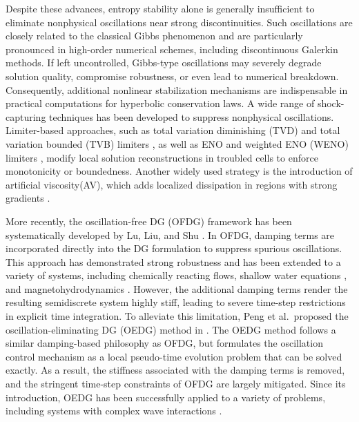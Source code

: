 \documentclass[fleqn,11pt]{amsart}
\begin{document}
Despite these advances, entropy stability alone is generally insufficient to eliminate nonphysical oscillations near strong discontinuities. Such oscillations are closely related to the classical Gibbs phenomenon \cite{gottlieb1997gibbs} and are particularly pronounced in high-order numerical schemes, including discontinuous Galerkin methods. If left uncontrolled, Gibbs-type oscillations may severely degrade solution
quality, compromise robustness, or even lead to numerical breakdown. Consequently, additional nonlinear stabilization mechanisms are indispensable
in practical computations for hyperbolic conservation laws.
A wide range of shock-capturing techniques has been developed to suppress nonphysical oscillations.
Limiter-based approaches, such as total variation diminishing (TVD) and total variation bounded (TVB) limiters \cite{cockburn1989tvb,burbeau2001problem}, as
well as ENO and weighted ENO (WENO) limiters
\cite{qiu2005runge,zhong2013simple,zhu2008runge}, modify local solution reconstructions in troubled cells to enforce monotonicity or boundedness. Another widely used strategy is the introduction of artificial viscosity(AV),
which adds localized dissipation in regions with strong gradients \cite{jameson1981numerical,jameson1993artificial,persson2006sub,barter2010shock}. 

More recently, the oscillation-free DG (OFDG) framework has been systematically developed by Lu, Liu, and Shu
\cite{lu2021oscillation,liu2022essentially}. In OFDG, damping terms are incorporated directly into the DG formulation to suppress spurious oscillations.
This approach has demonstrated strong robustness and has been extended to a variety of systems, including chemically reacting flows\cite{du2023oscillation,zuo2024positivity}, shallow water equations \cite{liu2022oscillation}, and magnetohydrodynamics \cite{liu2024entropy}.
However, the additional damping terms render the resulting semidiscrete system highly stiff, leading to severe time-step restrictions in explicit time integration.
To alleviate this limitation, Peng et al.\ proposed the
oscillation-eliminating DG (OEDG) method in \cite{peng2025oedg}. The OEDG method follows a similar damping-based philosophy as OFDG, but formulates the oscillation control mechanism as a local pseudo-time evolution problem that can be solved exactly.
As a result, the stiffness associated with the damping terms is removed, and the stringent time-step constraints of OFDG are largely mitigated. Since its introduction, OEDG has been successfully applied to a variety of
problems, including systems with complex wave interactions
\cite{liu2025structure,ding2025robust,yan2024uniformly}.
\end{document}
